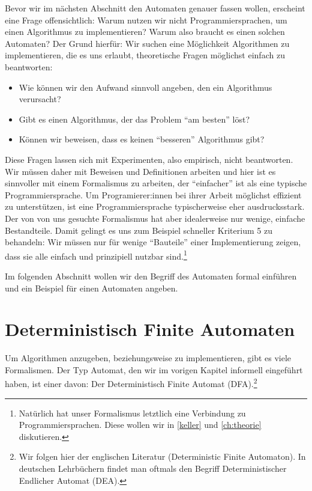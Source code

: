 Bevor wir im nächsten Abschnitt den Automaten genauer fassen wollen,
erscheint eine Frage offensichtlich:
Warum nutzen wir nicht Programmiersprachen, um einen Algorithmus zu implementieren?
Warum also braucht es einen solchen Automaten?
Der Grund hierfür:
Wir suchen eine Möglichkeit Algorithmen zu implementieren,
die es uns erlaubt,
theoretische Fragen möglichst einfach zu beantworten:
\begin{itemize}
    \item Wie können wir den Aufwand sinnvoll angeben, den ein Algorithmus verursacht?
    \item Gibt es einen Algorithmus, der das Problem ``am besten'' löst?
    \item Können wir beweisen, dass es keinen ``besseren'' Algorithmus gibt?
\end{itemize}
Diese Fragen lassen sich mit Experimenten, also empirisch, nicht beantworten.
Wir müssen daher mit Beweisen und Definitionen arbeiten
und hier ist es sinnvoller mit einem Formalismus zu arbeiten,
der ``einfacher'' ist als eine typische Programmiersprache.
Um Programierer:innen bei ihrer Arbeit möglichst effizient zu unterstützen,
ist eine Programmiersprache typischerweise eher ausdrucksstark.
Der von von uns gesuchte Formalismus hat aber idealerweise nur wenige, einfache Bestandteile.
Damit gelingt es uns zum Beispiel schneller Kriterium 5 zu behandeln:
Wir müssen nur für wenige ``Bauteile'' einer Implementierung zeigen,
dass sie alle einfach und prinzipiell nutzbar sind.\footnote{
    Natürlich hat unser Formalismus letztlich eine Verbindung zu Programmiersprachen.
    Diese wollen wir in \autoref{keller} und \autoref{ch:theorie} diskutieren.
}

Im folgenden Abschnitt wollen wir den Begriff des Automaten formal einführen
und ein Beispiel für einen Automaten angeben. 

\section{Deterministisch Finite Automaten}

Um Algorithmen anzugeben, beziehungsweise zu implementieren, gibt es viele Formalismen.
Der Typ Automat, den wir im vorigen Kapitel informell eingeführt haben,
ist einer davon:
Der Deterministisch Finite Automat (DFA).\footnote{
    Wir folgen hier der englischen Literatur (Deterministic Finite Automaton).
    In deutschen Lehrbüchern findet man oftmals den Begriff
    Deterministischer Endlicher Automat (DEA).
}

